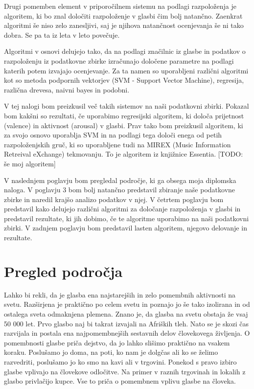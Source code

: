 \documentclass[a4paper, 12pt]{book}
\begin{document}
{Drugi pomemben element v priporočilnem sistemu na podlagi razpoloženja je algoritem, ki bo znal določiti razpoloženje v glasbi čim bolj natančno. Zaenkrat algoritmi še niso zelo zanesljivi, saj je njihova natančnost ocenjevanja še ni tako dobra. Se pa ta iz leta v leto povečuje. 

Algoritmi v osnovi delujejo tako, da na podlagi značilnic iz glasbe in podatkov o razpoloženju iz podatkovne zbirke izračunajo določene parametre na podlagi katerih potem izvajajo ocenjevanje. Za ta namen so uporabljeni različni algoritmi kot so metoda podpornih vektorjev (SVM - Support Vector Machine), regresija, različna drevesa, naivni bayes in podobni. 

V tej nalogi bom preizkusil več takih sistemov na naši podatkovni zbirki. Pokazal bom kakšni so rezultati, če uporabimo regresijski algoritem, ki določa prijetnost (valence) in aktivnost (arousal) v glasbi. Prav tako bom preizkusil algoritem, ki za svojo osnovo uporablja SVM in na podlagi tega določi enega od petih razpoloženjskih gruč, ki so uporabljene tudi na MIREX (Music Information Retreival eXchange) tekmovanju. To je algoritem iz knjižnice Essentia. [TODO: še moj algoritem]

V naslednjem poglavju bom pregledal področje, ki ga obsega moja diplomska naloga. V poglavju 3 bom bolj natančno predstavil zbiranje naše podatkovne zbirke in naredil krajšo analizo podatkov v njej. V četrtem poglavju bom predstavil kako delujejo različni algoritmi za določanje razpoloženja v glasbi in predstavil rezultate, ki jih dobimo, če te algoritme uporabimo na naši podatkovni zbirki. V zadnjem poglavju bom predstavil lasten algoritem, njegovo delovanje in rezultate. 

\chapter{Pregled področja}

Lahko bi rekli, da je glasba ena najstarejših in zelo pomembnih aktivnosti na svetu. Razširjena je praktično po celem svetu in poznajo jo še tako izolirana in od ostalega sveta odmaknjena plemena. Znano je, da glasba na svetu obstaja že vsaj 50 000 let. Prvo glasbo naj bi takrat izvajali na Afriških tleh. Nato se je skozi čas razvijala in postala ena najpomembnejših sestavnih delov človekovega življenja. \cite{wallin2001origins, krause2012great} O pomembnosti glasbe priča dejstvo, da jo lahko slišimo praktično na vsakem koraku. Poslušamo jo doma, na poti, ko nam je dolgčas ali ko se želimo razvedriti, poslušamo jo ko smo na kavi ali v trgovini. Ponekod s pravo izbiro glasbe vplivajo na človekove odločitve. Na primer v raznih trgovinah in lokalih z glasbo privlačijo kupce. Vse to priča o pomembnem vplivu glasbe na človeka.  

}
\end{document}

